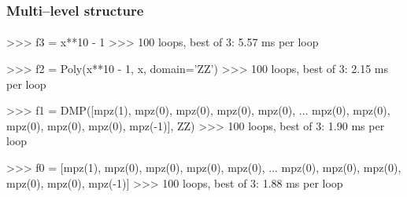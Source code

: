 \documentclass{beamer}
\begin{document}
\begin{frame}[fragile]
    \frametitle{Multi--level structure}
    \framesubtitle{}

    \begin{python}
>>> f3 = x**10 - 1
>>> %
100 loops, best of 3: 5.57 ms per loop

>>> f2 = Poly(x**10 - 1, x, domain='ZZ')
>>> %
100 loops, best of 3: 2.15 ms per loop

>>> f1 = DMP([mpz(1), mpz(0), mpz(0), mpz(0), mpz(0),
... mpz(0), mpz(0), mpz(0), mpz(0), mpz(0), mpz(-1)], ZZ)
>>> %
100 loops, best of 3: 1.90 ms per loop

>>> f0 = [mpz(1), mpz(0), mpz(0), mpz(0), mpz(0),
... mpz(0), mpz(0), mpz(0), mpz(0), mpz(0), mpz(-1)]
>>> %
100 loops, best of 3: 1.88 ms per loop
    \end{python}
\end{frame}
\end{document}

